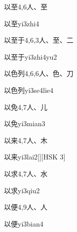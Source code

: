 \begin{entry}{以至}{4,6}{⼈、⾄}
  \begin{phonetics}{以至}{yi3zhi4}
  \end{phonetics}
\end{entry}

\begin{entry}{以至于}{4,6,3}{⼈、⾄、⼆}
  \begin{phonetics}{以至于}{yi3zhi4yu2}
  \end{phonetics}
\end{entry}

\begin{entry}{以色列}{4,6,6}{⼈、⾊、⼑}
  \begin{phonetics}{以色列}{yi3se4lie4}
  \end{phonetics}
\end{entry}

\begin{entry}{以免}{4,7}{⼈、⼉}
  \begin{phonetics}{以免}{yi3mian3}
  \end{phonetics}
\end{entry}

\begin{entry}{以来}{4,7}{⼈、⽊}
  \begin{phonetics}{以来}{yi3lai2}[][HSK 3]
  \end{phonetics}
\end{entry}

\begin{entry}{以求}{4,7}{⼈、⽔}
  \begin{phonetics}{以求}{yi3qiu2}
  \end{phonetics}
\end{entry}

\begin{entry}{以便}{4,9}{⼈、⼈}
  \begin{phonetics}{以便}{yi3bian4}
  \end{phonetics}
\end{entry}

